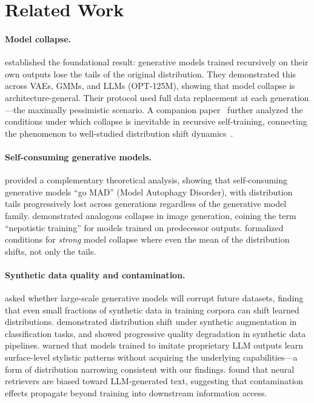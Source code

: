 \documentclass{article}
\begin{document}
\section{Related Work}
\label{sec:related}

\paragraph{Model collapse.}
\citet{shumailov2024curse} established the foundational result: generative models trained recursively on their own outputs lose the tails of the original distribution.
They demonstrated this across VAEs, GMMs, and LLMs (OPT-125M), showing that model collapse is architecture-general.
Their protocol used full data replacement at each generation---the maximally pessimistic scenario.
A companion paper~\citep{shumailov2024ai} further analyzed the conditions under which collapse is inevitable in recursive self-training, connecting the phenomenon to well-studied distribution shift dynamics~\citep{quinonerocandela2009dataset,morenotorres2012unifying}.

\paragraph{Self-consuming generative models.}
\citet{alemohammad2023selfconsuming} provided a complementary theoretical analysis, showing that self-consuming generative models ``go MAD'' (Model Autophagy Disorder), with distribution tails progressively lost across generations regardless of the generative model family.
\citet{bohacek2023nepotistically} demonstrated analogous collapse in image generation, coining the term ``nepotistic training'' for models trained on predecessor outputs.
\citet{dohmatob2024strong} formalized conditions for \emph{strong} model collapse where even the mean of the distribution shifts, not only the tails.

\paragraph{Synthetic data quality and contamination.}
\citet{hataya2023will} asked whether large-scale generative models will corrupt future datasets, finding that even small fractions of synthetic data in training corpora can shift learned distributions.
\citet{martinez2023towards} demonstrated distribution shift under synthetic augmentation in classification tasks, and \citet{briesch2023large} showed progressive quality degradation in synthetic data pipelines.
\citet{gudibande2023false} warned that models trained to imitate proprietary LLM outputs learn surface-level stylistic patterns without acquiring the underlying capabilities---a form of distribution narrowing consistent with our findings.
\citet{long2024llms} found that neural retrievers are biased toward LLM-generated text, suggesting that contamination effects propagate beyond training into downstream information access.
\end{document}
